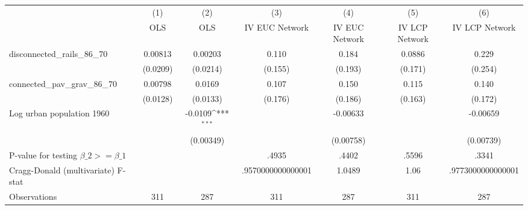 {
\def\sym#1{\ifmmode^{#1}\else\(^{#1}\)\fi}
\begin{tabular}{l*{6}{c}}
\hline\hline
                &\multicolumn{1}{c}{(1)}&\multicolumn{1}{c}{(2)}&\multicolumn{1}{c}{(3)}&\multicolumn{1}{c}{(4)}&\multicolumn{1}{c}{(5)}&\multicolumn{1}{c}{(6)}\\
                &\multicolumn{1}{c}{OLS}&\multicolumn{1}{c}{OLS}&\multicolumn{1}{c}{IV EUC Network}&\multicolumn{1}{c}{IV EUC Network}&\multicolumn{1}{c}{IV LCP Network}&\multicolumn{1}{c}{IV LCP Network}\\
\hline
disconnected\_rails\_86\_70&  0.00813         &  0.00203         &    0.110         &    0.184         &   0.0886         &    0.229         \\
                & (0.0209)         & (0.0214)         &  (0.155)         &  (0.193)         &  (0.171)         &  (0.254)         \\
[1em]
connected\_pav\_grav\_86\_70&  0.00798         &   0.0169         &    0.107         &    0.150         &    0.115         &    0.140         \\
                & (0.0128)         & (0.0133)         &  (0.176)         &  (0.186)         &  (0.163)         &  (0.172)         \\
[1em]
Log urban population 1960&                  &  -0.0109\sym{***}&                  & -0.00633         &                  & -0.00659         \\
                &                  &(0.00349)         &                  &(0.00758)         &                  &(0.00739)         \\
\hline
P-value for testing $\beta\_{2} >= \beta\_{1}$&                  &                  &    .4935         &    .4402         &    .5596         &    .3341         \\
Cragg-Donald (multivariate) F-stat&                  &                  &.9570000000000001         &   1.0489         &     1.06         &.9773000000000001         \\
Observations    &      311         &      287         &      311         &      287         &      311         &      287         \\
\hline\hline
\end{tabular}
}
